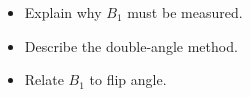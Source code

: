 \begin{objectives}
\begin{itemize}[leftmargin=1.4em,itemsep=2pt]
\item Explain why $B_1$ must be measured.
\item Describe the double-angle method.
\item Relate $B_1$ to flip angle.
\end{itemize}
\end{objectives}
